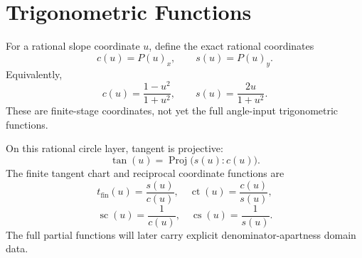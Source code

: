 \section{Trigonometric Functions}

\begin{definition}
\label{def:rational-circle-sin-cos}
For a rational slope coordinate \(u\), define the exact rational coordinates
\[
  c(u)=P(u)_x,\qquad s(u)=P(u)_y.
\]
Equivalently,
\[
  c(u)=\frac{1-u^2}{1+u^2},
  \qquad
  s(u)=\frac{2u}{1+u^2}.
\]
These are finite-stage coordinates, not yet the full angle-input
trigonometric functions.
\end{definition}

\begin{definition}
\label{def:rational-circle-other-trig}
On this rational circle layer, tangent is projective:
\[
  \tan(u)=\operatorname{Proj}\bigl(s(u):c(u)\bigr).
\]
The finite tangent chart and reciprocal coordinate functions are
\[
  t_{\mathrm{fin}}(u)=\frac{s(u)}{c(u)},\quad
  \operatorname{ct}(u)=\frac{c(u)}{s(u)},
\]
\[
  \operatorname{sc}(u)=\frac1{c(u)},\quad
  \operatorname{cs}(u)=\frac1{s(u)}.
\]
The full partial functions will later carry explicit denominator-apartness
domain data.
\end{definition}

